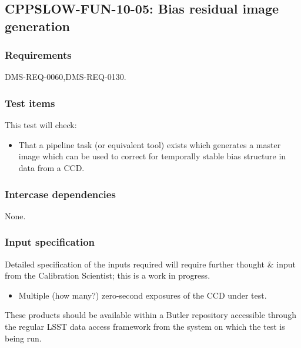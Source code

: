 \subsection{CPPSLOW-FUN-10-05: Bias residual image generation}
\label{cppslow-fun-10-05}

\subsubsection{Requirements}

DMS-REQ-0060,DMS-REQ-0130.

\subsubsection{Test items}

This test will check:

\begin{itemize}

  \item{That a pipeline task (or equivalent tool) exists which generates a
  master image which can be used to correct for temporally stable bias structure
  in data from a CCD.}

\end{itemize}

\subsubsection{Intercase dependencies}

None.

\subsubsection{Input specification}

\begin{note}
Detailed specification of the inputs required will require further thought \&
input from the Calibration Scientist; this is a work in progress.
\end{note}

\begin{itemize}

  \item{Multiple (how many?) zero-second exposures of the CCD under test.}

\end{itemize}

These products should be available within a Butler repository accessible
through the regular LSST data access framework from the system on which the test
is being run.

